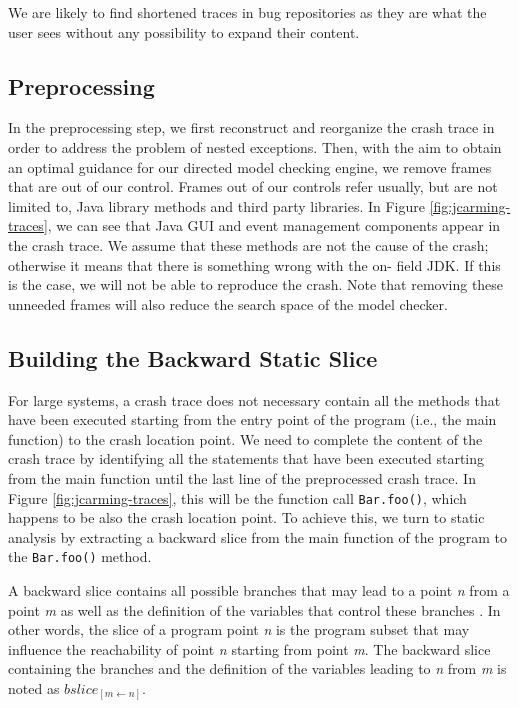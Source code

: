 \documentclass[times]{smrauth}
\begin{document}
We are likely to find shortened traces in bug repositories as
they are what the user sees without any possibility to expand
their content.

\subsection{Preprocessing}

In the preprocessing step, we first reconstruct and reorganize
the crash trace in order to address the problem of nested
exceptions. Then, with the aim to obtain an optimal guidance for our directed model checking engine, we remove frames
that are out of our control. Frames out of our controls refer
usually, but are not limited to, Java library methods and third
party libraries. In Figure \ref{fig:jcarming-traces}, we can see that Java GUI and
event management components appear in the crash trace. We
assume that these methods are not the cause of the crash;
otherwise it means that there is something wrong with the on-
field JDK. If this is the case, we will not be able to reproduce
the crash. Note that removing these unneeded frames will also
reduce the search space of the model checker.

\subsection{Building the Backward Static Slice}

For large systems, a crash trace does not necessary contain all
the methods that have been executed starting from the entry
point of the program (i.e., the main function) to the crash
location point. We need to complete the content of the crash
trace by identifying all the statements that have been executed
starting from the main function until the last line of the
preprocessed crash trace. In Figure \ref{fig:jcarming-traces}, this will be the function
call {\tt Bar.foo()}, which happens to be also the crash location
point. To achieve this, we turn to static analysis by extracting
a backward slice from the main function of the program to the
{\tt Bar.foo()} method.

A backward slice contains all possible branches that may lead
to a point {\it n} from a point {\it m} as well as the definition of the
variables that control these branches \cite{de2001program}. In other words, the
slice of a program point {\it n} is the program subset that may
influence the reachability of point {\it n} starting from point {\it m}.
The backward slice containing the branches and the definition
of the variables leading to {\it n} from {\it m} is noted as {\it $bslice_{[m \leftarrow n]}$}.
\end{document}
